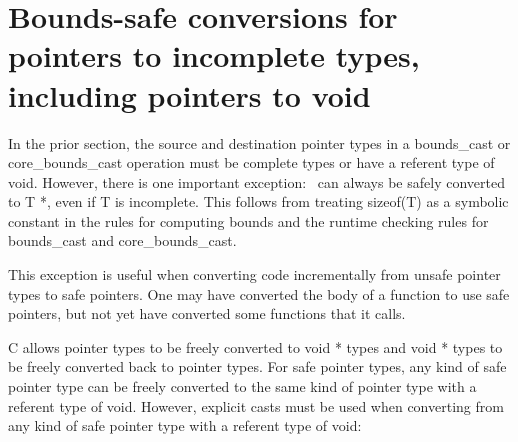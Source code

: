 \section{Bounds-safe conversions for pointers to incomplete types, including pointers to void}

In the prior section, the source and destination pointer types in a
bounds\_cast or core\_bounds\_cast operation must be complete types or
have a referent type of void. However, there is one important exception:
\ptrT\ can always be safely converted to T *,
even if T is incomplete. This follows from treating sizeof(T) as a
symbolic constant in the rules for computing bounds and the runtime
checking rules for bounds\_cast and core\_bounds\_cast.

This exception is useful when converting code incrementally from unsafe
pointer types to safe pointers. One may have converted the body of a
function to use safe pointers, but not yet have converted some functions
that it calls.

C allows pointer types to be freely converted to void * types and void *
types to be freely converted back to pointer types. For safe pointer
types, any kind of safe pointer type can be freely converted to the same
kind of pointer type with a referent type of void. However, explicit
casts must be used when converting from any kind of safe pointer type
with a referent type of void:

